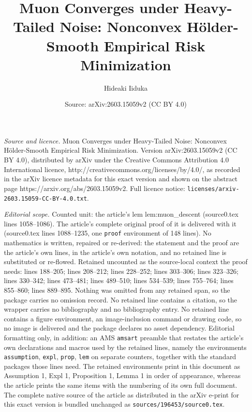 \documentclass[10pt,a4paper]{amsart}
\title{Muon Converges under Heavy-Tailed Noise: Nonconvex H\"{o}lder-Smooth Empirical Risk Minimization}
\author{Hideaki Iiduka}
\date{Source: arXiv:2603.15059v2 (CC BY 4.0)}
\begin{document}
\maketitle

\noindent\emph{Source and licence.} Muon Converges under Heavy-Tailed Noise: Nonconvex H\"{o}lder-Smooth Empirical Risk Minimization. Version arXiv:2603.15059v2 (CC BY 4.0), distributed by arXiv under the Creative Commons Attribution 4.0 International licence, http://creativecommons.org/licenses/by/4.0/, as recorded in the arXiv licence metadata for this exact version and shown on the abstract page https://arxiv.org/abs/2603.15059v2. Full licence notice: \texttt{licenses/arxiv-2603.15059-CC-BY-4.0.txt}.\par\smallskip

\noindent\textit{Editorial scope.} Counted unit: the article's lem lem:muon\_descent (source0.tex lines 1058--1086). The article's complete original proof of it is delivered with it (source0.tex lines 1088--1235, one \texttt{proof} environment of 148 lines). No mathematics is written, repaired or re-derived: the statement and the proof are the article's own lines, in the article's own notation, and no retained line is substituted or re-flowed.  Retained uncounted as the source-local context the proof needs: lines 188--205; lines 208--212; lines 228--252; lines 303--306; lines 323--326; lines 330--342; lines 473--481; lines 489--510; lines 534--539; lines 755--764; lines 855--860; lines 889--895.  Nothing was omitted from any retained span, so the package carries no omission record.  No retained line contains a citation, so the wrapper carries no bibliography and no bibliography entry.  No retained line contains a figure environment, an image-inclusion command or drawing code, so no image is delivered and the package declares no asset dependency.  Editorial formatting only, in addition: an AMS \texttt{amsart} preamble that restates the article's own declarations and macros used by the retained lines, namely the environments \texttt{assumption}, \texttt{expl}, \texttt{prop}, \texttt{lem} on separate counters, together with the standard packages those lines need.  The retained environments print in this document as Assumption 1, Expl 1, Proposition 1, Lemma 1 in order of appearance, whereas the article prints the same items with the numbering of its own full document.  The complete native source of the article as distributed in the arXiv e-print for this exact version is bundled unchanged as \texttt{sources/196453/source0.tex}.
\end{document}
